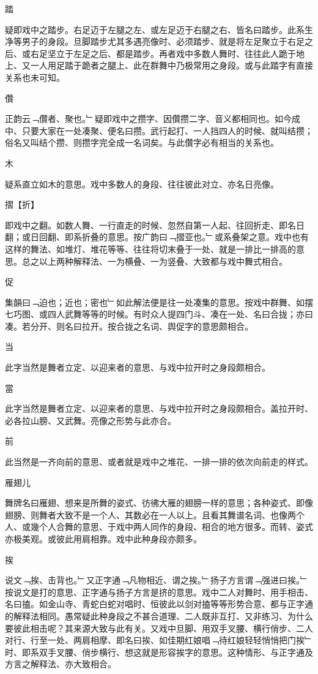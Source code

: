 \documentclass{zhvt-classic}
\begin{document}
踏

疑即戏中之踏步。右足迈于左腿之左、或左足迈于右腿之右、皆名曰踏步。此系生净等男子的身段。旦脚踏步尤其多遇亮像时、必须踏步、就是将左足聚立于右足之后、或右足坚立于左足之后、都是踏步。再者戏中多数人舞时、往往此人跪于地上、又一人用足踏于跪者之腿上、此在群舞中乃极常用之身段。或与此踏字有直接关系也未可知。

儹

正韵云﹁儹者、聚也。﹂疑即戏中之攒字、因儹攒二字、音义都相同也。如今成中、只要大家在一处凑聚、便名曰攒。武行起打、一人挡四人的时候、就叫结攒；俗名又叫结个攒、则攒字完全成一名词矣。与此儹字必有相当的关系也。

木

疑系直立如木的意思。戏中多数人的身段、往往彼此对立、亦名日亮像。

摺【折】

即戏中之翻。如数人舞、一行直走的时候、忽然自第一人起、往回折走、即名日翻；或日回翻、即系折叠的意思。按广韵曰﹁摺亚也。﹂或系叠架之意。戏中也有这样的舞法、如堆灯、堆花等等、往往将切末叠于一处、就是一排比一排高的意思。总之以上两种解释法、一为横叠、一为竖叠、大致都与戏中舞式相合。

促

集韻曰﹁迫也；近也；密也﹂如此解法便是往一处凑集的意思。按戏中群舞、如摆七巧图、或四人武舞等等的时候。有时众人提四门斗、凑在一处、名曰合拢；亦曰凑。若分开、则名曰拉开。按合拢之名词、舆促字的意思颇相合。

当

此字当然是舞者立定、以迎来者的意思、与戏中拉开时之身段颇相合。

當

此字当然是舞者立定、以迎来者的意思、与戏中拉开时之身段颇相合。盖拉开时、必各拉山膀、又武舞。亮像之形势与此亦合。

前

此当然是一齐向前的意思、或者就是戏中之堆花、一排一排的依次向前走的样式。

雁翅儿

舞牌名曰雁翅、想来是所舞的姿式、彷彿大雁的翅膀一样的意思；各种姿式、即像翅膀、则舞者大致不是一个人、其数必在一人以上。且看其舞谱名词、也像两个人、或幾个人合舞的意思、于戏中两人同作的身段、相合的地方很多。而转、姿式亦极美观。或彼此用肩相靠。戏中此种身段亦颇多。

挨

说文﹁挨、击背也。﹂又正字通﹁凡物相近、谓之挨。﹂扬子方言谓﹁强进曰挨。﹂按说文是打的意思、正字通与扬子方言是挤的意思。戏中二人对舞时、用手相击、名曰搕。如金山寺、青蛇白蛇对唱时、恒彼此以剑对搕等等形势合意、都与正字通的解释法相同。愚常疑此种身段之不甚合道理、二人既非互打、又非练习、为什么要彼此相击呢？其来源大致与此有关。又戏中旦脚、用双手叉腰、横行俏步、二人对行、行至一处、两肩相摩、即名曰挨、如佳期红娘唱﹁待红娘轻轻悄悄把门挨﹂时、即系双手叉腰、俏步横行、想这就是形容挨字的意思。这种情形、与正字通及方言之解释法、亦大致相合。
\end{document}
